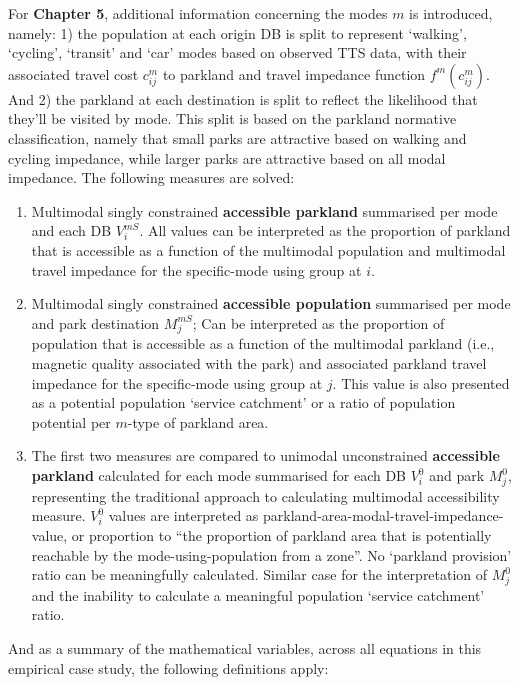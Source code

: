 \documentclass[
11pt, %
oneside, %
english, %
singlespacing, %
]{macthesis} %
\def\tightlist{}
\begin{document}
For \textbf{Chapter 5}, additional information concerning the modes \(m\) is introduced, namely: 1) the population at each origin DB is split to represent `walking', `cycling', `transit' and `car' modes based on observed TTS data, with their associated travel cost \(c_{ij}^m\) to parkland and travel impedance function \(f^m (c^m_{ij})\). And 2) the parkland at each destination is split to reflect the likelihood that they'll be visited by mode. This split is based on the parkland normative classification, namely that small parks are attractive based on walking and cycling impedance, while larger parks are attractive based on all modal impedance. The following measures are solved:

\begin{enumerate}
\def\labelenumi{\arabic{enumi}.}
\tightlist
\item
  Multimodal singly constrained \textbf{accessible parkland} summarised per mode and each DB \(V_i^{mS}\). All values can be interpreted as the proportion of parkland that is accessible as a function of the multimodal population and multimodal travel impedance for the specific-mode using group at \(i\).
\item
  Multimodal singly constrained \textbf{accessible population} summarised per mode and park destination \(M_j^{mS}\); Can be interpreted as the proportion of population that is accessible as a function of the multimodal parkland (i.e., magnetic quality associated with the park) and associated parkland travel impedance for the specific-mode using group at \(j\). This value is also presented as a potential population `service catchment' or a ratio of population potential per \(m\)-type of parkland area.
\item
  The first two measures are compared to unimodal unconstrained \textbf{accessible parkland} calculated for each mode summarised for each DB \(V_i^{0}\) and park \(M_j^{0}\), representing the traditional approach to calculating multimodal accessibility measure. \(V_i^{0}\) values are interpreted as parkland-area-modal-travel-impedance-value, or proportion to ``the proportion of parkland area that is potentially reachable by the mode-using-population from a zone''. No `parkland provision' ratio can be meaningfully calculated. Similar case for the interpretation of \(M_j^{0}\) and the inability to calculate a meaningful population `service catchment' ratio.
\end{enumerate}

And as a summary of the mathematical variables, across all equations in this empirical case study, the following definitions apply:
\end{document}
